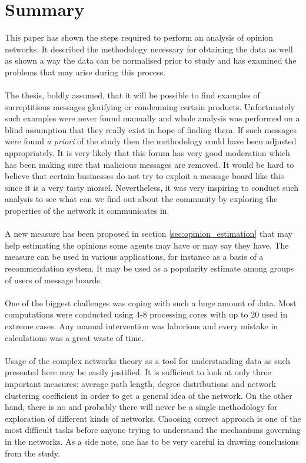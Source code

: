 \chapter{Summary}

  This paper has shown the steps required to perform an analysis of opinion networks. It described the methodology necessary for obtaining the data as well as shown a way the data can be normalised prior to study and has examined the problems that may arise during this process.
  \\\\
  The thesis, boldly assumed, that it will be possible to find examples of surreptitious messages glorifying or condemning certain products. Unfortunately such examples were never found manually and whole analysis was performed on a blind assumption that they really exist in hope of finding them. If such messages were found \emph{a priori} of the study then the methodology could have been adjusted appropriately. It is very likely that this forum has very good moderation which has been making sure that malicious messages are removed. It would be hard to believe that certain businesses do not try to exploit a message board like this since it is a very tasty morsel. Nevertheless, it was very inspiring to conduct such analysis to see what can we find out about the community by exploring the properties of the network it communicates in.
  \\\\
  A new measure has been proposed in section \ref{sec:opinion_estimation} that may help estimating the opinions some agents may have or may say they have. The measure can be used in various applications, for instance as a basis of a recommendation system. It may be used as a popularity estimate among groups of users of message boards.
  \\\\
  One of the biggest challenges was coping with such a huge amount of data. Most computations were conducted using 4-8 processing cores with up to 20 used in extreme cases. Any manual intervention was laborious and every mistake in calculations was a great waste of time.
  \\\\
  Usage of the complex networks theory as a tool for understanding data as such presented here may be easily justified. It is sufficient to look at only three important measures: average path length, degree distributions and network clustering coefficient in order to get a general idea of the network. On the other hand, there is no and probably there will never be a single methodology for exploration of different kinds of networks. Choosing correct approach is one of the most difficult tasks before anyone trying to understand the mechanisms governing in the networks. As a side note, one has to be very careful in drawing conclusions from the study.

